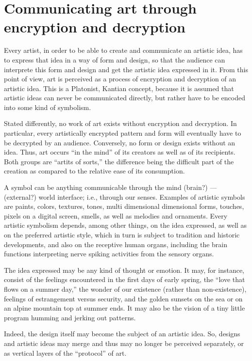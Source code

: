\documentclass[rmp,amssymb,showpacs,showkeys,12pt,preprint]{revtex4}
\begin{document}
\section{Communicating art through encryption and decryption}

Every artist, in order to be able to create and communicate an artistic idea, has to express that idea in a way of form and design, so that the audience can interprete this form and design and get the artistic idea expressed in it.
From this point of view, art is perceived as a process of encryption and decryption of an artistic idea.
This is a Platonist, Kantian concept, because it is assumed that artistic ideas can never be communicated directly, but rather have to be encoded into some kind of symbolism.

Stated differently, no work of art exists without encryption and decryption.
In particular, every artistically encrypted pattern and form will eventually have to be decrypted by an audience.
Conversely, no form or design exists without an idea.
Thus, art occurs ``in the mind'' of its creators as well as of its recipients.
Both groups are ``artits of sorts,'' the difference being the difficult part of the creation as compared to the relative ease of its consumption.

A symbol can be anything communicable through the mind (brain?) --- (external?) world interface; i.e., through our senses.
Examples of artistic symbols are paints, colors, textures, tones, multi dimensional dimensional forms, touches, pixels on a digital screen, smells, as well as melodies and ornaments.
Every artistic symbolism depends, among other things,
on the idea expressed, as well as
on the preferred artistic style, which in turn is subject to tradition and historic developments, and also on the receptive human organs, including the brain functions interpreting nerve spiking activities from the sensory organs.

The idea expressed may be any kind of thought or emotion.
It may, for instance, consist of the feelings encountered in the first days of early spring,
the ``love that flows on a summer day,''
the wonder of our existence (rather than non-existence),
feelings of estrangement versus security,
and the golden sunsets on the sea or on an alpine mountain top at summer ends.
It may also be the vision of a tiny little program humming and jerking out patterns.

Indeed, the design itself may become the subject of an artistic idea.
So, designs and artistic ideas may merge and thus may no longer be perceived separately, or as vertical layers of the ``protocol'' of art.
\end{document}
